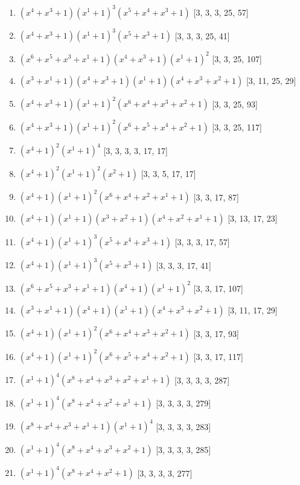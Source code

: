 \documentclass[10pt,twocolumn]{article}
\begin{document}
\begin{enumerate}
\item $(x^{4} + x^{3} + 1)(x^{1} + 1)^{3}(x^{5} + x^{4} + x^{3} + 1)$  [3, 3, 3, 25, 57]
\item $(x^{4} + x^{3} + 1)(x^{1} + 1)^{3}(x^{5} + x^{3} + 1)$  [3, 3, 3, 25, 41]
\item $(x^{6} + x^{5} + x^{3} + x^{1} + 1)(x^{4} + x^{3} + 1)(x^{1} + 1)^{2}$  [3, 3, 25, 107]
\item $(x^{3} + x^{1} + 1)(x^{4} + x^{3} + 1)(x^{1} + 1)(x^{4} + x^{3} + x^{2} + 1)$  [3, 11, 25, 29]
\item $(x^{4} + x^{3} + 1)(x^{1} + 1)^{2}(x^{6} + x^{4} + x^{3} + x^{2} + 1)$  [3, 3, 25, 93]
\item $(x^{4} + x^{3} + 1)(x^{1} + 1)^{2}(x^{6} + x^{5} + x^{4} + x^{2} + 1)$  [3, 3, 25, 117]
\item $(x^{4} + 1)^{2}(x^{1} + 1)^{4}$  [3, 3, 3, 3, 17, 17]
\item $(x^{4} + 1)^{2}(x^{1} + 1)^{2}(x^{2} + 1)$  [3, 3, 5, 17, 17]
\item $(x^{4} + 1)(x^{1} + 1)^{2}(x^{6} + x^{4} + x^{2} + x^{1} + 1)$  [3, 3, 17, 87]
\item $(x^{4} + 1)(x^{1} + 1)(x^{3} + x^{2} + 1)(x^{4} + x^{2} + x^{1} + 1)$  [3, 13, 17, 23]
\item $(x^{4} + 1)(x^{1} + 1)^{3}(x^{5} + x^{4} + x^{3} + 1)$  [3, 3, 3, 17, 57]
\item $(x^{4} + 1)(x^{1} + 1)^{3}(x^{5} + x^{3} + 1)$  [3, 3, 3, 17, 41]
\item $(x^{6} + x^{5} + x^{3} + x^{1} + 1)(x^{4} + 1)(x^{1} + 1)^{2}$  [3, 3, 17, 107]
\item $(x^{3} + x^{1} + 1)(x^{4} + 1)(x^{1} + 1)(x^{4} + x^{3} + x^{2} + 1)$  [3, 11, 17, 29]
\item $(x^{4} + 1)(x^{1} + 1)^{2}(x^{6} + x^{4} + x^{3} + x^{2} + 1)$  [3, 3, 17, 93]
\item $(x^{4} + 1)(x^{1} + 1)^{2}(x^{6} + x^{5} + x^{4} + x^{2} + 1)$  [3, 3, 17, 117]
\item $(x^{1} + 1)^{4}(x^{8} + x^{4} + x^{3} + x^{2} + x^{1} + 1)$  [3, 3, 3, 3, 287]
\item $(x^{1} + 1)^{4}(x^{8} + x^{4} + x^{2} + x^{1} + 1)$  [3, 3, 3, 3, 279]
\item $(x^{8} + x^{4} + x^{3} + x^{1} + 1)(x^{1} + 1)^{4}$  [3, 3, 3, 3, 283]
\item $(x^{1} + 1)^{4}(x^{8} + x^{4} + x^{3} + x^{2} + 1)$  [3, 3, 3, 3, 285]
\item $(x^{1} + 1)^{4}(x^{8} + x^{4} + x^{2} + 1)$  [3, 3, 3, 3, 277]

\end{enumerate}
\end{document}
